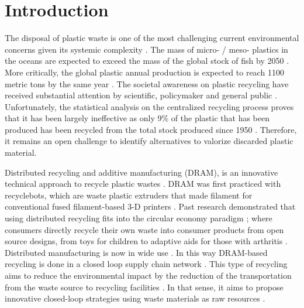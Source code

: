 \documentclass[
  12pt,
  number]{article}
\begin{document}
\hypertarget{introduction}{%
\section{Introduction}\label{introduction}}

The disposal of plastic waste is one of the most challenging current
environmental concerns given its systemic complexity \citep{evode2021}.
The mass of micro- / meso- plastics in the oceans are expected to exceed
the mass of the global stock of fish by 2050 \citep{macarthur2017}. More
critically, the global plastic annual production is expected to reach
1100 metric tons by the same year \citep{geyer2020}. The societal
awareness on plastic recycling have received substantial attention by
scientific, policymaker and general public \citep{soares2021}.
Unfortunately, the statistical analysis on the centralized recycling
process proves that it has been largely ineffective
\citep{godswillImpactsPlasticPollution2019a} as only 9\% of the plastic
that has been produced has been recycled from the total stock produced
since 1950 \citep{Geyer2017}. Therefore, it remains an open challenge to
identify alternatives to valorize discarded plastic material.

Distributed recycling and additive manufacturing (DRAM), is an
innovative technical approach to recycle plastic wastes
\citep{cruzsanchez2020, dertinger2020}. DRAM was first practiced with
recyclebots, which are waste plastic extruders that made filament for
conventional fused filament-based 3-D printers
\citep{baechler2013, zhong2018, woern2018}. Past research demonstrated
that using distributed recycling fits into the circular economy paradigm
\citep{Ford2016, Despeisse2016}; where consumers directly recycle their
own waste into consumer products from open source designs, from toys for
children \citep{Petersen2017} to adaptive aids for those with arthritis
\citep{gallup2018}. Distributed manufacturing is now in wide use
\citep{pearce2022}. In this way DRAM-based recycling is done in a closed
loop supply chain network \citep{santander2020}. This type of recycling
aims to reduce the environmental impact by the reduction of the
transportation from the waste source to recycling facilities
\citep{kreiger2014}. In that sense, it aims to propose innovative
closed-loop strategies using waste materials as raw resources
\citep{romani2021}.
\end{document}
